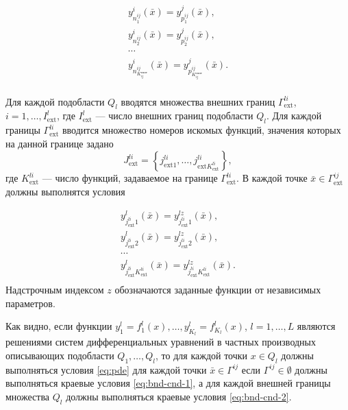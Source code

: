 \documentclass[a4paper,12pt]{article}
\begin{document}
\begin{equation}
    \begin{array}{ll}
        y^i_{n^{ij}_1}(\bar{x})=y^j_{p^{ij}_1}(\bar{x}),\\
        y^i_{n^{ij}_2}(\bar{x})=y^j_{p^{ij}_2}(\bar{x}),\\
        \cdots \\
        y^i_{n^{ij}_{K^{соот}_{ij}}}(\bar{x})=
        y^j_{p^{ij}_{K^{соот}_{ij}}}(\bar{x}).\\
    \end{array}
    \label{eq:bnd-cnd-1}
\end{equation}

Для каждой подобласти $Q_l$ вводятся множества внешних границ 
$\Gamma^{li}_{\text{ext}}$, $i=1,\ldots,I^{l}_{\text{ext}}$, где $I^l_{\text{ext}}$ --- число
внешних границ подобласти $Q_l$. Для каждой границы $\Gamma^{li}_{\text{ext}}$ 
вводится множество номеров искомых функций, значения которых на данной
границе задано $$J^{li}_{\text{ext}}=\left\{j^{li}_{\text{ext} 1},\ldots,
j^{li}_{\text{ext} K^{li}_{\text{ext}}}\right\},$$ где $K^{li}_{\text{ext}}$ --- число 
функций, задаваемое на границе $\Gamma^{li}_{\text{ext}}$. В каждой точке
$\bar{x} \in \Gamma^{ij}_{\text{ext}}$ должны выполнятся условия

\begin{equation}
    \begin{array}{ll}
        y^l_{j^{li}_{\text{ext} }1}(\bar{x})=
          y^{lz}_{j^{li}_{\text{ext} }1}(\bar{x}),\\
        y^l_{j^{li}_{\text{ext} }2}(\bar{x})=
          y^{lz}_{j^{li}_{\text{ext} }2}(\bar{x}),\\
        \cdots \\
        y^l_{j^{li}_{\text{ext}} K^{li}_{\text{ext}}}(\bar{x})=
        y^{lz}_{j^{li}_{\text{ext}} K^{li}_{\text{ext}}}(\bar{x}).\\
    \end{array}
    \label{eq:bnd-cnd-2}
\end{equation}
Надстрочным индексом $z$ обозначаются заданные функции от независимых
параметров.

Как видно, если функции $y^l_1=f^l_1(x),\ldots,y^l_{K_l}=f^l_{K_l}(x)$,
$l=1,\ldots,L$ являются решениями систем дифференциальных уравнений в
частных производных описывающих подобласти $Q_1,\ldots,Q_l$, то для
каждой точки $x \in Q_l$ должны выполняться условия \eqref{eq:pde} для
каждой точки $\bar{x} \in \Gamma^{ij}$ если $\Gamma^{ij} \in \emptyset$
должны выполняться краевые условия \eqref{eq:bnd-cnd-1}, а для каждой 
внешней границы множества $Q_l$ должны выполняться краевые условия
\eqref{eq:bnd-cnd-2}. 
\end{document}
